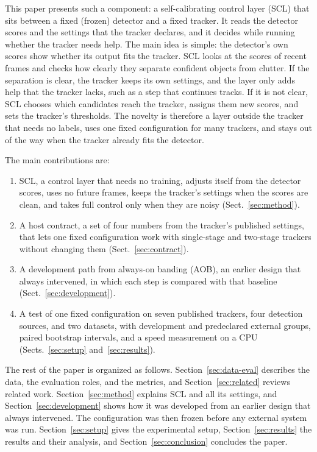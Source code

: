 \documentclass[pdflatex,sn-mathphys-num,iicol]{sn-jnl}
\newcommand{\scl}{SCL}
\newcommand{\aob}{AOB}
\begin{document}
This paper presents such a component: a self-calibrating control layer (\scl{})
that sits between a fixed (frozen) detector and a fixed tracker. It reads the
detector scores and the settings that the tracker declares, and it decides
while running whether the tracker needs help. The main idea is simple: the
detector's own scores show whether its output fits the tracker. \scl{} looks
at the scores of recent frames and checks how clearly they separate confident
objects from clutter. If the separation is clear, the tracker keeps its own
settings, and the layer only adds help that the tracker lacks, such as a step
that continues tracks. If it is not clear, \scl{} chooses which candidates
reach the tracker, assigns them new scores, and sets the tracker's thresholds.
The novelty is therefore a layer outside the tracker that needs no labels,
uses one fixed configuration for many trackers, and stays out of the way when
the tracker already fits the detector.

The main contributions are:
\begin{enumerate}
\item \scl{}, a control layer that needs no training, adjusts itself from the
      detector scores, uses no future frames, keeps the tracker's settings
      when the scores are clean, and takes full control only when they are
      noisy (Sect.~\ref{sec:method}).
\item A host contract, a set of four numbers from the tracker's published
      settings, that lets one fixed configuration work with single-stage and
      two-stage trackers without changing them (Sect.~\ref{sec:contract}).
\item A development path from always-on banding (\aob{}), an earlier design
      that always intervened, in which each step is compared with that
      baseline (Sect.~\ref{sec:development}).
\item A test of one fixed configuration on seven published trackers, four
      detection sources, and two datasets, with development and predeclared
      external groups, paired bootstrap intervals, and a speed measurement on
      a CPU (Sects.~\ref{sec:setup} and~\ref{sec:results}).
\end{enumerate}

The rest of the paper is organized as follows. Section~\ref{sec:data-eval}
describes the data, the evaluation roles, and the metrics, and
Section~\ref{sec:related} reviews related work. Section~\ref{sec:method}
explains \scl{} and all its settings, and Section~\ref{sec:development} shows
how it was developed from an earlier design that always intervened. The
configuration was then frozen before any external system was run.
Section~\ref{sec:setup} gives the experimental setup,
Section~\ref{sec:results} the results and their analysis, and
Section~\ref{sec:conclusion} concludes the paper.
\end{document}
